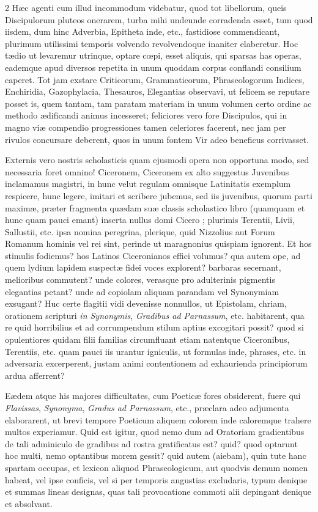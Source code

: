 \begin{multicols}{2}
Hæc agenti cum illud incommodum videbatur, quod tot libellorum, queis Discipulorum pluteos onerarem, turba mihi undeunde corradenda esset, tum quod iisdem, dum hinc Adverbia, Epitheta inde, etc., fastidiose commendicant, plurimum utilissimi temporis volvendo revolvendoque inaniter elaberetur. Hoc tædio ut levaremur utrinque, optare cœpi, esset aliquis, qui sparsas has operas, eademque apud diversos repetita in unum quoddam corpus conflandi consilium caperet. Tot jam exstare Criticorum, Grammaticorum, Phraseologorum Indices, Enchiridia, Gazophylacia, Thesauros, Elegantias observavi, ut felicem se reputare posset is, quem tantam, tam paratam materiam in unum volumen certo ordine ac methodo ædificandi animus incesseret; feliciores vero fore Discipulos, qui in magno viæ compendio progressiones tamen celeriores facerent, nec jam per rivulos concursare deberent, quos in unum fontem Vir adeo beneficus corrivasset.

Externis vero nostris scholasticis quam ejusmodi opera non opportuna modo, sed necessaria foret omnino! Ciceronem, Ciceronem ex alto suggestus Juvenibus inclamamus magistri, in hunc velut regulam omnisque Latinitatis exemplum respicere, hunc legere, imitari et scribere jubemus, sed iis juvenibus, quorum parti maximæ, præter fragmenta quædam suæ classis scholastico libro (quamquam et hunc quam pauci emant) inserta nullus domi Cicero ; plurimis Terentii, Livii, Sallustii, etc. ipsa nomina peregrina, plerique, quid Nizzolius aut Forum Romanum hominis vel rei sint, perinde ut maragnonius quispiam ignorent. Et hos stimulis fodiemus? hos Latinos Ciceronianos effici volumus? qua autem ope, ad quem lydium lapidem suspectæ fidei voces explorent? barbaras secernant, melioribus commutent? unde colores, verasque pro adulterinis pigmentis elegantias petant? unde ad copiolam aliquam parandam vel Synonymiam exsugant? Huc certe flagitii vidi devenisse nonnullos, ut Epistolam, chriam, orationem scripturi \textit{in Synonymis}, \textit{Gradibus ad Parnassum}, etc. habitarent, qua re quid horribilius et ad corrumpendum stilum aptius excogitari possit? quod si opulentiores quidam filii familias circumfluant etiam natentque Ciceronibus, Terentiis, etc. quam pauci iis urantur igniculis, ut formulas inde, phrases, etc. in adversaria excerperent, justam animi contentionem ad exhaurienda principiorum ardua afferrent?

Eædem atque his majores difficultates, cum Poeticæ fores obsiderent, fuere qui \textit{Flavissas}, \textit{Synonyma}, \textit{Gradus ad Parnassum}, etc., præclara adeo adjumenta elaborarent, ut brevi tempore Poeticum aliquem colorem inde caloremque trahere multos experiamur. Quid est igitur, quod nemo dum ad Oratoriam gradientibus de tali adminiculo de gradibus ad rostra gratificatus est? quid? quod optarunt hoc multi, nemo optantibus morem gessit? quid autem (aiebam), quin tute hanc spartam occupas, et lexicon aliquod Phraseologicum, aut quodvis demum nomen habeat, vel ipse conficis, vel si per temporis angustias excludaris, typum denique et summas lineas designas, quas tali provocatione commoti alii depingant denique et absolvant.


\end{multicols}

